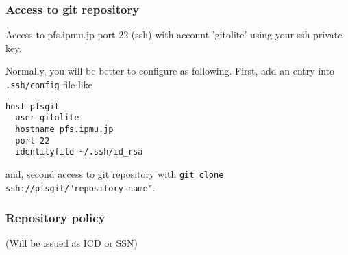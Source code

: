 \documentclass[a4paper,notitlepage]{article}
\begin{document}
\subsubsection{Access to git repository}

Access to pfs.ipmu.jp port 22 (ssh) with account 'gitolite' 
using your ssh private key. 

Normally, you will be better to configure as following. 
First, add an entry into {\tt .ssh/config} file like 

\begin{verbatim}
host pfsgit
  user gitolite
  hostname pfs.ipmu.jp
  port 22
  identityfile ~/.ssh/id_rsa
\end{verbatim}

and, second access to git repository with 
{\tt git clone ssh://pfsgit/"repository-name"}.

\subsubsection{Repository policy}

\tbd (Will be issued as ICD or SSN)
\end{document}

